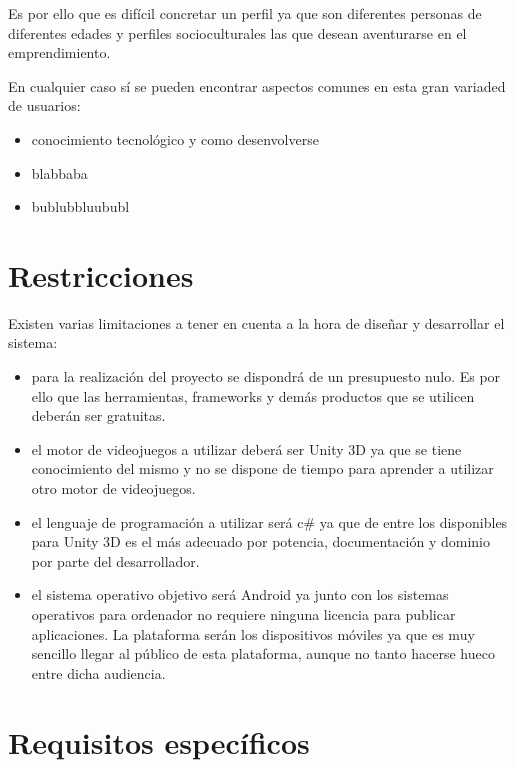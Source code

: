 Es por ello que es difícil concretar un perfil ya que son diferentes personas de diferentes edades y perfiles socioculturales las que desean aventurarse en el emprendimiento.

En cualquier caso sí se pueden encontrar aspectos comunes en esta gran variaded de usuarios:

\begin{itemize}

\item conocimiento tecnológico y como desenvolverse
\item blabbaba
\item bublubbluububl

\end{itemize}

\section{Restricciones}

Existen varias limitaciones a tener en cuenta a la hora de diseñar y desarrollar el sistema:

\begin{itemize}

\item para la realización del proyecto se dispondrá de un presupuesto nulo. Es por ello que las herramientas, frameworks y demás productos que se utilicen deberán ser gratuitas.
\item el motor de videojuegos a utilizar deberá ser Unity 3D ya que se tiene conocimiento del mismo y no se dispone de tiempo para aprender a utilizar otro motor de videojuegos.
\item el lenguaje de programación a utilizar será c\# ya que de entre los disponibles para Unity 3D es el más adecuado por potencia, documentación y dominio por parte del desarrollador.
\item el sistema operativo objetivo será Android ya junto con los sistemas operativos para ordenador no requiere ninguna licencia para publicar aplicaciones. La plataforma serán los dispositivos móviles ya que es muy sencillo llegar al público de esta plataforma, aunque no tanto hacerse hueco entre dicha audiencia.

\end{itemize}

\section{Requisitos específicos}

